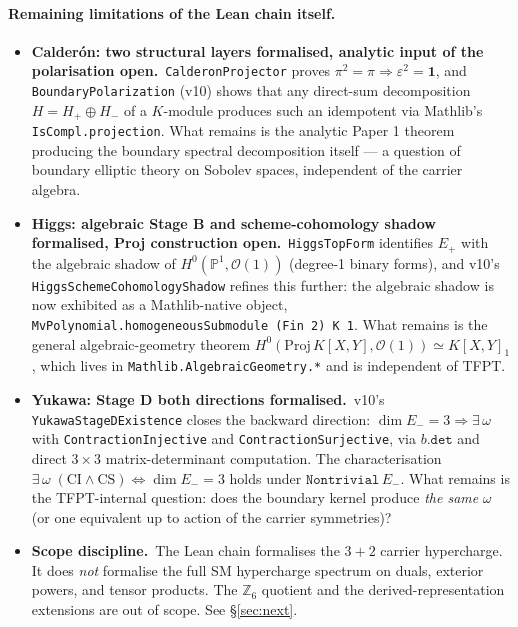 \paragraph{Remaining limitations of the Lean chain itself.}
\begin{itemize}[leftmargin=1.6em, itemsep=1pt]
\item \textbf{Calder\'on: two structural layers formalised,
    analytic input of the polarisation open.}\
    \texttt{CalderonProjector} proves $\pi^2 = \pi
    \Rightarrow \varepsilon^2 = \mathbf 1$, and
    \texttt{BoundaryPolarization} (v10) shows that any
    direct-sum decomposition $H = H_+ \oplus H_-$ of a
    $K$-module produces such an idempotent via Mathlib's
    \texttt{IsCompl.projection}. What remains is the analytic
    Paper 1 theorem producing the boundary spectral
    decomposition itself --- a question of boundary elliptic
    theory on Sobolev spaces, independent of the carrier
    algebra.
\item \textbf{Higgs: algebraic Stage B and scheme-cohomology
    shadow formalised, Proj construction open.}\
    \texttt{HiggsTopForm} identifies $E_+$ with the algebraic
    shadow of $H^0(\mathbb P^1, \mathcal O(1))$ (degree-1 binary
    forms), and v10's \texttt{HiggsSchemeCohomologyShadow}
    refines this further: the algebraic shadow is now exhibited
    as a Mathlib-native object,
    \texttt{MvPolynomial.homogeneousSubmodule (Fin 2) K 1}.
    What remains is the general algebraic-geometry theorem
    $H^0(\mathrm{Proj}\,K[X,Y], \mathcal O(1)) \simeq K[X, Y]_1$,
    which lives in \texttt{Mathlib.AlgebraicGeometry.*} and is
    independent of TFPT.
\item \textbf{Yukawa: Stage D both directions formalised.}\
    v10's \texttt{YukawaStageDExistence} closes the backward
    direction:
    $\dim E_- = 3 \Rightarrow \exists\,\omega$ with
    \texttt{ContractionInjective} and
    \texttt{ContractionSurjective}, via $b.\texttt{det}$ and
    direct $3{\times}3$ matrix-determinant computation. The
    characterisation
    $\exists\,\omega\;(\textrm{CI} \wedge \textrm{CS})
      \iff \dim E_- = 3$ holds under
    $\texttt{Nontrivial}\,E_-$. What remains is the
    TFPT-internal question: does the boundary kernel produce
    \emph{the same} $\omega$ (or one equivalent up to action of
    the carrier symmetries)?
\item \textbf{Scope discipline.}\ The Lean chain formalises the
    $3+2$ carrier hypercharge. It does \emph{not} formalise the
    full SM hypercharge spectrum on duals, exterior powers, and
    tensor products. The $\mathbb Z_6$ quotient and the
    derived-representation extensions are out of scope. See
    \S\ref{sec:next}.
\end{itemize}

